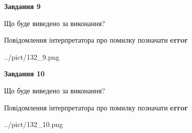 \documentclass[12pt, ukrainian]{article}
\begin{document}
{{\begin {center}\textbf{Завдання 9}\end {center}}\par
Що буде виведено за виконання? \par
Повідомлення інтерпретатора про помилку позначати \textbf{error}

\begin{center}
	{../pict/132_9.png}
\end{center}
\newpage

{\begin {center}\textbf{Завдання 10}\end {center}}\par
Що буде виведено за виконання? \par
Повідомлення інтерпретатора про помилку позначати \textbf{error}

\begin{center}
	{../pict/132_10.png}
\end{center}
\newpage

}
\end{document}
